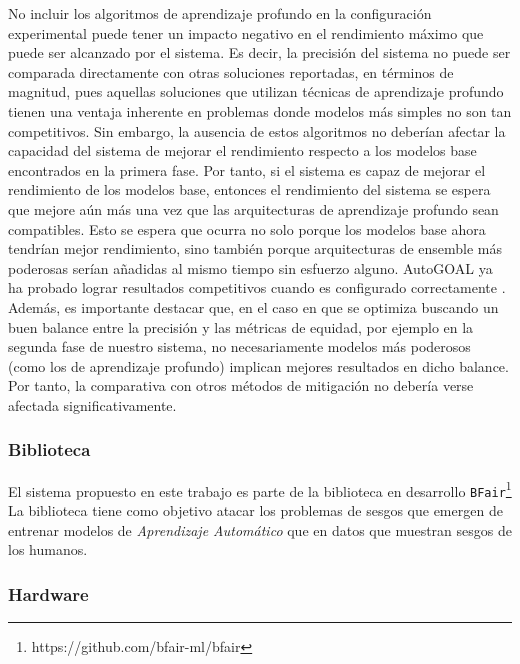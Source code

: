 No incluir los algoritmos de aprendizaje profundo en la configuración experimental puede tener un impacto negativo en el rendimiento máximo que puede ser alcanzado por el sistema.
Es decir, la precisión del sistema no puede ser comparada directamente con otras soluciones reportadas, en términos de magnitud, pues aquellas soluciones que utilizan técnicas de aprendizaje profundo tienen una ventaja inherente en problemas donde modelos más simples no son tan competitivos.
Sin embargo, la ausencia de estos algoritmos no deberían afectar la capacidad del sistema de mejorar el rendimiento respecto a los modelos base encontrados en la primera fase.
Por tanto, si el sistema es capaz de mejorar el rendimiento de los modelos base, entonces el rendimiento del sistema se espera que mejore aún más una vez que las arquitecturas de aprendizaje profundo sean compatibles.
Esto se espera que ocurra no solo porque los modelos base ahora tendrían mejor rendimiento, sino también porque arquitecturas de ensemble más poderosas serían añadidas al mismo tiempo sin esfuerzo alguno.
AutoGOAL ya ha probado lograr resultados competitivos cuando es configurado correctamente \parencite{estevez2020automatic}.
Además, es importante destacar que, en el caso en que se optimiza buscando un buen balance entre la precisión y las métricas de equidad, por ejemplo en la segunda fase de nuestro sistema, no necesariamente modelos más poderosos (como los de aprendizaje profundo) implican mejores resultados en dicho balance.
Por tanto, la comparativa con otros métodos de mitigación no debería verse afectada significativamente.

\subsubsection{Biblioteca}\label{section:library}

El sistema propuesto en este trabajo es parte de la biblioteca en desarrollo \texttt{BFair}\footnote{https://github.com/bfair-ml/bfair}
La biblioteca tiene como objetivo atacar los problemas de sesgos que emergen de entrenar modelos de \emph{Aprendizaje Automático} que en datos que muestran sesgos de los humanos.


\subsubsection{Hardware}\label{section:hardware}

